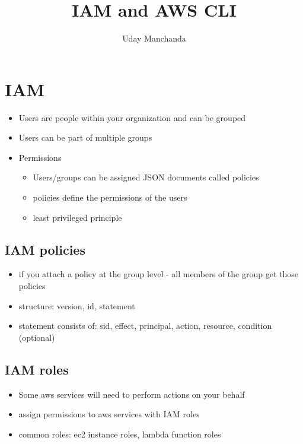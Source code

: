 \documentclass[]{scrartcl}
\title{IAM and AWS CLI}
\author{Uday Manchanda}
\begin{document}
\maketitle

\section{IAM}
\begin{itemize}
	\item Users are people within your organization and can be grouped
	\item Users can be part of multiple groups
	\item Permissions
	\begin{itemize}
		\item Users/groups can be assigned JSON documents called policies
		\item policies define the permissions of the users
		\item least privileged principle
	\end{itemize}
\end{itemize}

\subsection{IAM policies}
\begin{itemize}
	\item if you attach a policy at the group level - all members of the group get those policies
	\item structure: version, id, statement
	\item statement consists of: sid, effect, principal, action, resource, condition (optional)
\end{itemize}

\subsection{IAM roles}
\begin{itemize}
	\item Some aws services will need to perform actions on your behalf
	\item assign permissions to aws services with IAM roles
	\item common roles: ec2 instance roles, lambda function roles
\end{itemize}
\end{document}
